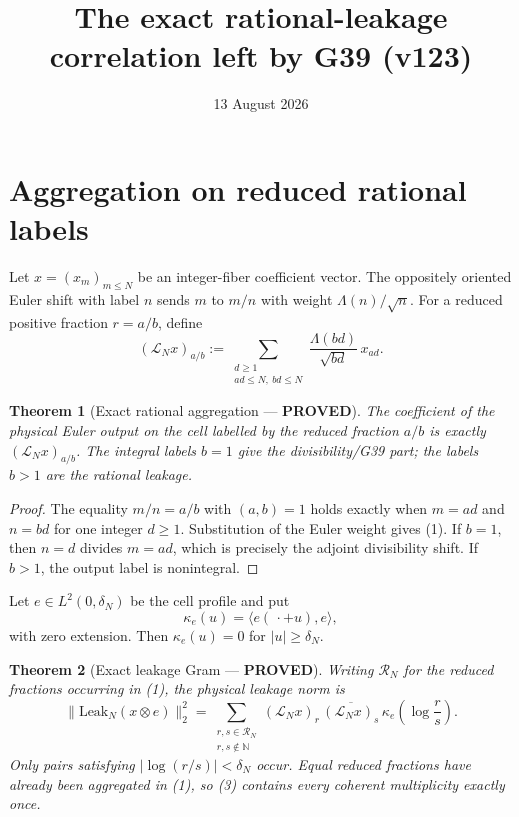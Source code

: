 \documentclass[11pt]{article}
\title{The exact rational-leakage correlation left by G39 (v123)}
\date{13 August 2026}
\newcommand{\PROVED}{\textcolor{green!40!black}{\textbf{PROVED}}}
\newtheorem{theorem}{Theorem}
\begin{document}
\maketitle

\section{Aggregation on reduced rational labels}

Let $x=(x_m)_{m\le N}$ be an integer-fiber coefficient vector.  The
oppositely oriented Euler shift with label $n$ sends $m$ to $m/n$ with
weight $\Lambda(n)/\sqrt n$.  For a reduced positive fraction $r=a/b$,
define
\begin{equation}
 (\mathcal L_Nx)_{a/b}
 :=\sum_{\substack{d\ge1\\ad\le N,\ bd\le N}}
       \frac{\Lambda(bd)}{\sqrt{bd}}\,x_{ad}.                 \tag{1}
\end{equation}

\begin{theorem}[Exact rational aggregation --- \PROVED]
The coefficient of the physical Euler output on the cell labelled by the
reduced fraction $a/b$ is exactly $(\mathcal L_Nx)_{a/b}$.  The integral
labels $b=1$ give the divisibility/G39 part; the labels $b>1$ are the
rational leakage.
\end{theorem}

\begin{proof}
The equality $m/n=a/b$ with $(a,b)=1$ holds exactly when
$m=ad$ and $n=bd$ for one integer $d\ge1$.  Substitution of the Euler
weight gives (1).  If $b=1$, then $n=d$ divides $m=ad$, which is precisely
the adjoint divisibility shift.  If $b>1$, the output label is nonintegral.
\end{proof}

Let $e\in L^2(0,\delta_N)$ be the cell profile and put
\begin{equation}
 \kappa_e(u)=\langle e(\,\cdot+u),e\rangle,                  \tag{2}
\end{equation}
with zero extension.  Then $\kappa_e(u)=0$ for $|u|\ge\delta_N$.

\begin{theorem}[Exact leakage Gram --- \PROVED]
Writing $\mathscr R_N$ for the reduced fractions occurring in (1), the
physical leakage norm is
\begin{equation}
 \boxed{
 \|\mathrm{Leak}_N(x\otimes e)\|_2^2
 =\sum_{\substack{r,s\in\mathscr R_N\\r,s\notin\mathbb N}}
  (\mathcal L_Nx)_r\,
  \overline{(\mathcal L_Nx)_s}\,
  \kappa_e\!\left(\log\frac rs\right).}                     \tag{3}
\end{equation}
Only pairs satisfying
$|\log(r/s)|<\delta_N$ occur.  Equal reduced fractions have already been
aggregated in (1), so (3) contains every coherent multiplicity exactly
once.
\end{theorem}
\end{document}
